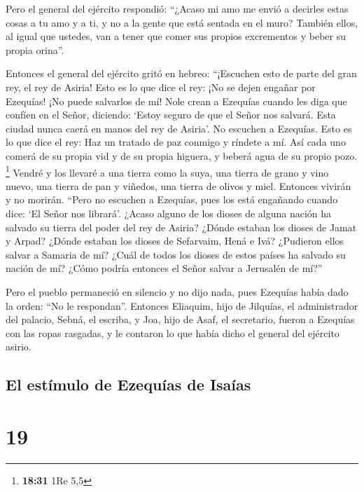  Pero el general del ejército respondió: ``¿Acaso mi amo
me envió a decirles estas cosas a tu amo y a ti, y no a la gente que
está sentada en el muro? También ellos, al igual que ustedes, van a
tener que comer sus propios excrementos y beber su propia orina''.

 Entonces el general del ejército gritó en hebreo:
``¡Escuchen esto de parte del gran rey, el rey de Asiria!
 Esto es lo que dice el rey: ¡No se dejen engañar por
Ezequías! ¡No puede salvarlos de mí!  Nole crean a
Ezequías cuando les diga que confíen en el Señor, diciendo: `Estoy
seguro de que el Señor nos salvará. Esta ciudad nunca caerá en manos del
rey de Asiria'.  No escuchen a Ezequías. Esto es lo que
dice el rey: Haz un tratado de paz conmigo y ríndete a mí. Así cada uno
comerá de su propia vid y de su propia higuera, y beberá agua de su
propio pozo. \footnote{\textbf{18:31} 1Re 5,5}  Vendré y
los llevaré a una tierra como la suya, una tierra de grano y vino nuevo,
una tierra de pan y viñedos, una tierra de olivos y miel. Entonces
vivirán y no morirán. ``Pero no escuchen a Ezequías, pues los está
engañando cuando dice: `El Señor nos librará'.  ¿Acaso
alguno de los dioses de alguna nación ha salvado su tierra del poder del
rey de Asiria?  ¿Dónde estaban los dioses de Jamat y
Arpad? ¿Dónde estaban los dioses de Sefarvaim, Hená e Ivá? ¿Pudieron
ellos salvar a Samaria de mí?  ¿Cuál de todos los dioses
de estos países ha salvado su nación de mí? ¿Cómo podría entonces el
Señor salvar a Jerusalén de mí?''

 Pero el pueblo permaneció en silencio y no dijo nada,
pues Ezequías había dado la orden: ``No le respondan''. 
Entonces Eliaquim, hijo de Jilquías, el administrador del palacio,
Sebná, el escriba, y Joa, hijo de Asaf, el secretario, fueron a Ezequías
con las ropas rasgadas, y le contaron lo que había dicho el general del
ejército asirio.

\hypertarget{el-estuxedmulo-de-ezequuxedas-de-isauxedas}{%
\subsection{El estímulo de Ezequías de
Isaías}\label{el-estuxedmulo-de-ezequuxedas-de-isauxedas}}

\hypertarget{section-18}{%
\section{19}\label{section-18}}

